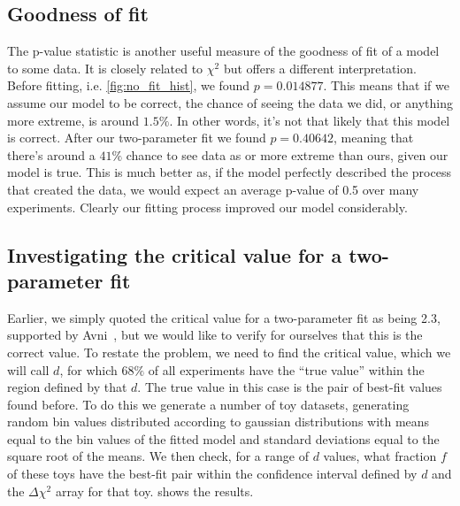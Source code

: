 \documentclass[11pt]{article}
\newcommand{\chisq}{\chi^2}
\numberwithin{equation}{section}
\numberwithin{figure}{section}
\numberwithin{table}{section}
\begin{document}
\subsection{Goodness of fit}
The p-value statistic is another useful measure of the goodness of fit of a model to some data. It is closely related to $\chisq$ but offers a different interpretation. Before fitting, i.e. \cref{fig:no_fit_hist}, we found $p=0.014877$. This means that if we assume our model to be correct, the chance of seeing the data we did, or anything more extreme, is around $1.5\%$. In other words, it's not that likely that this model is correct. After our two-parameter fit we found $p=0.40642$, meaning that there's around a $41\%$ chance to see data as or more extreme than ours, given our model is true. This is much better as, if the model perfectly described the process that created the data, we would expect an average p-value of 0.5 over many experiments. Clearly our fitting process improved our model considerably. 

\subsection{Investigating the critical value for a two-parameter fit}
Earlier, we simply quoted the critical value for a two-parameter fit as being 2.3, supported by Avni~\cite{XRay_energy_spectra}, but we would like to verify for ourselves that this is the correct value. To restate the problem, we need to find the critical value, which we will call $d$, for which $68\%$ of all experiments have the ``true value'' within the region defined by that $d$. The true value in this case is the pair of best-fit values found before. To do this we generate a number of toy datasets, generating random bin values distributed according to gaussian distributions with means equal to the bin values of the fitted model and standard deviations equal to the square root of the means. We then check, for a range of $d$ values, what fraction $f$ of these toys have the best-fit pair within the confidence interval defined by $d$ and the $\Delta\chisq$ array for that toy.  shows the results.
\end{document}
